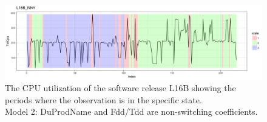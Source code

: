 \begin{figure}[H]
\begin{centering}
\includegraphics[scale=0.35]{picture/L16B_NNY1}
\par\end{centering}
\caption{The CPU utilization of the software release L16B showing the periods
where the observation is in the specific state. \protect \\
Model 2: DuProdName and Fdd/Tdd are non-switching coefficients.}
\label{L16B_NNY}
\end{figure}


